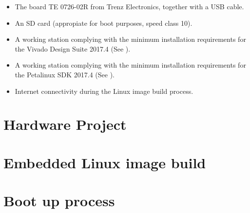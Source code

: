 \begin{itemize}
	\item The board TE 0726-02R from Trenz Electronics, together with a USB cable.
	\item An SD card (appropiate for boot purposes, speed class 10).
	\item A working station complying with the minimum installation requirements for the Vivado
	Design Suite 2017.4 (See \cite{UG973}).
	\item A working station complying with the minimum installation requirements for the Petalinux
	SDK 2017.4 (See \cite{UG1144}).
	\item Internet connectivity during the Linux image build process.
\end{itemize}


\section{Hardware Project}

\section{Embedded Linux image build}

\section{Boot up process}
